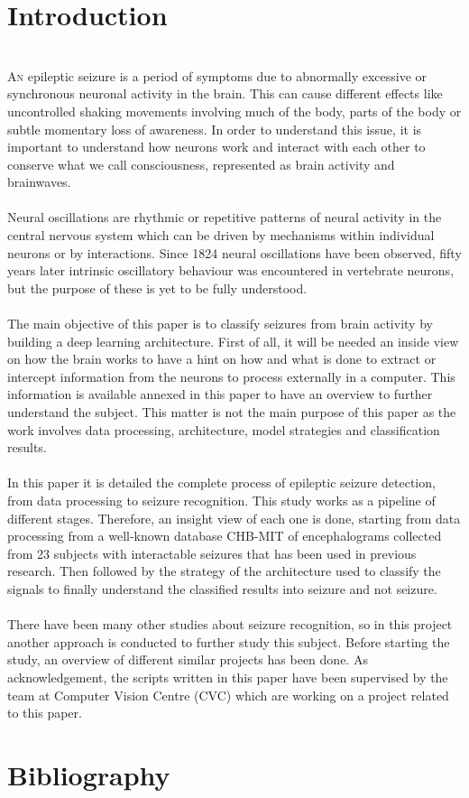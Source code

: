 ﻿\documentclass[10pt,a4paper,twocolumn,twoside]{article}
\begin{document}
\section{Introduction}
\leavevmode\\
\lettrine[lines=3]{A}{n} epileptic seizure is a period of symptoms due to abnormally excessive or synchronous neuronal activity in the brain. This can cause different effects like uncontrolled shaking movements involving much of the body, parts of the body or subtle momentary loss of awareness. In order to understand this issue, it is important to understand how neurons work and interact with each other to conserve what we call consciousness, represented as brain activity and brainwaves.
\\\\
Neural oscillations are rhythmic or repetitive patterns of neural activity in the central nervous system which can be driven by mechanisms within individual neurons or by interactions. Since 1824 neural oscillations have been observed, fifty years later intrinsic oscillatory behaviour was encountered in vertebrate neurons, but the purpose of these is yet to be fully understood.
\\\\
The main objective of this paper is to classify seizures from brain activity by building a deep learning architecture. First of all, it will be needed an inside view on how the brain works to have a hint on how and what is done to extract or intercept information from the neurons to process externally in a computer. This information is available annexed in this paper to have an overview to further understand the subject. This matter is not the main purpose of this paper as the work involves data processing, architecture, model strategies and classification results.
\\\\
In this paper it is detailed the complete process of epileptic seizure detection, from data processing to seizure recognition. This study works as a pipeline of different stages. Therefore, an insight view of each one is done, starting from data processing from a well-known database CHB-MIT of encephalograms collected from 23 subjects with interactable seizures that has been used in previous research. Then followed by the strategy of the architecture used to classify the signals to finally understand the classified results into seizure and not seizure.
\\\\
There have been many other studies about seizure recognition, so in this project another approach is conducted to further study this subject. Before starting the study, an overview of different similar projects has been done. As acknowledgement, the scripts written in this paper have been supervised by the team at Computer Vision Centre (CVC) which are working on a project related to this paper.








\section{Bibliography}

\printbibliography



\end{document}
